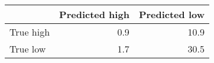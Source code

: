 \begin{tabular}{lrr}
\hline
           &   Predicted high &   Predicted low \\
\hline
 True high &              0.9 &            10.9 \\
 True low  &              1.7 &            30.5 \\
\hline
\end{tabular}